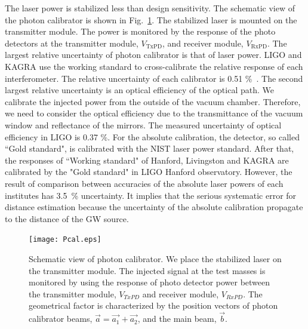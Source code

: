\documentclass[%
 reprint,
superscriptaddress,
 amsmath,amssymb,
 aps,
]{revtex4-1}
\begin{document}
The laser power is stabilized less than design sensitivity. The schematic view of the photon calibrator is shown in Fig.~\ref{fig:Pcal}. The stabilized laser is mounted on the transmitter module. The power is monitored by the response of the photo detectors at the transmitter module, $V_{\mathrm{TxPD}}$, and receiver module, $V_{\mathrm{RxPD}}$.  
The largest relative uncertainty of photon calibrator is that of laser power.
LIGO and KAGRA use the working standard to cross-calibrate the relative response of each interferometer. The relative uncertainty of  each  calibrator is 0.51 \%~\cite{doi:10.1063/1.4967303}. 
The second largest relative uncertainty is an optical efficiency of the optical path. We calibrate the injected power from the outside of the vacuum chamber. Therefore, we need to consider the optical efficiency due to the transmittance of the vacuum window and reflectance of the mirrors. The measured uncertainty of optical efficiency in LIGO is 0.37 \%. 
For the absolute calibration, the detector, so called ``Gold standard", is calibrated with the NIST laser power standard. After that, the responses of ``Working standard" of Hanford, Livingston and KAGRA are calibrated by the "Gold standard" in LIGO Hanford observatory. 
However, the result of comparison between accuracies of the absolute laser powers of each institutes has 3.5~\% uncertainty. It implies that the serious systematic error for distance estimation because the uncertainty of the absolute calibration propagate to the distance of the GW source.

\begin{figure}
\begin{center}
\texttt{[image: Pcal.eps]}
\caption{Schematic view of photon calibrator. We place the stabilized laser on the transmitter module. The injected signal at the test masses is monitored by using the response of photo detector power between the transmitter module, $V_{TxPD}$ and  receiver module, $V_{RxPD}$.  The geometrical factor is characterized by the position vectors of photon calibrator beams, $\vec{a}=\vec{a_1}+\vec{a_2}$, and the main beam, $\vec{b}$.}
\label{fig:Pcal}
\end{center}
\end{figure}
\end{document}
